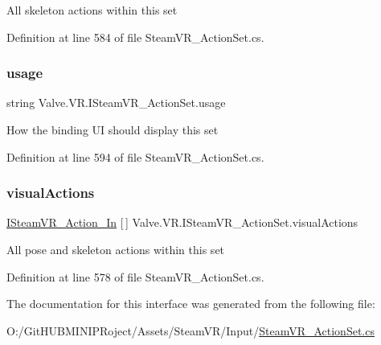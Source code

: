 All skeleton actions within this set 



Definition at line 584 of file Steam\+V\+R\+\_\+\+Action\+Set.\+cs.

\mbox{\label{interface_valve_1_1_v_r_1_1_i_steam_v_r___action_set_a3a9a545f8fe81d35957692d330d388f4}} 
\subsubsection{\texorpdfstring{usage}{usage}}
{\footnotesize\ttfamily string Valve.\+V\+R.\+I\+Steam\+V\+R\+\_\+\+Action\+Set.\+usage\hspace{0.3cm}{\ttfamily [get]}}



How the binding UI should display this set 



Definition at line 594 of file Steam\+V\+R\+\_\+\+Action\+Set.\+cs.

\mbox{\label{interface_valve_1_1_v_r_1_1_i_steam_v_r___action_set_a2016acc2f64a6a292126fe2b33ac928d}} 
\subsubsection{\texorpdfstring{visualActions}{visualActions}}
{\footnotesize\ttfamily \mbox{\hyperlink{interface_valve_1_1_v_r_1_1_i_steam_v_r___action___in}{I\+Steam\+V\+R\+\_\+\+Action\+\_\+\+In}} \mbox{[}$\,$\mbox{]} Valve.\+V\+R.\+I\+Steam\+V\+R\+\_\+\+Action\+Set.\+visual\+Actions\hspace{0.3cm}{\ttfamily [get]}}



All pose and skeleton actions within this set 



Definition at line 578 of file Steam\+V\+R\+\_\+\+Action\+Set.\+cs.



The documentation for this interface was generated from the following file\+:\begin{DoxyCompactItemize}
\item 
O\+:/\+Git\+H\+U\+B\+M\+I\+N\+I\+P\+Roject/\+Assets/\+Steam\+V\+R/\+Input/\mbox{\hyperlink{_steam_v_r___action_set_8cs}{Steam\+V\+R\+\_\+\+Action\+Set.\+cs}}\end{DoxyCompactItemize}
